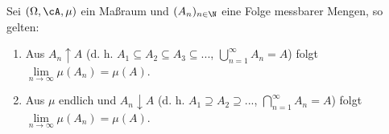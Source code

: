 
\marginpar{\textcolor{red}{Vorlesung 2}}

\begin{satz}\label{S1}
	Sei $(\Omega, \cA, \mu)$ ein Maßraum und $(A_n)_{n\in \N}$ eine Folge messbarer Mengen, so gelten:
	\begin{enumerate}[label=(\roman*)]
		\item Aus $A_n \uparrow A$ (d. h. $A_1 \subseteq A_2 \subseteq A_3\subseteq ...$, $\bigcup_{n=1}^{\infty} A_n = A$) folgt $\lim\limits_{n \to \infty} \mu (A_n)= \mu (A)$.
		\item Aus $\mu$ endlich und $A_n \downarrow A$ (d. h. $A_1 \supseteq A_2 \supseteq ...$, $\bigcap\limits_{n=1}^{\infty}A_n=A$) folgt $\lim\limits_{n \to \infty}\mu (A_n)=\mu(A)$.
	\end{enumerate}
\end{satz}

